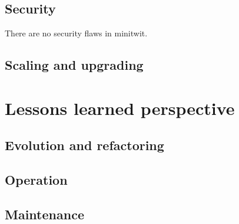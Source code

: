\documentclass{article}
\begin{document}
\subsection{Security}
There are no security flaws in minitwit.\cite{me}

\subsection{Scaling and upgrading}

\section{Lessons learned perspective}

\subsection{Evolution and refactoring}

\subsection{Operation}

\subsection{Maintenance}
\end{document}
